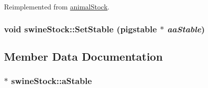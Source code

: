 Reimplemented from \hyperlink{classanimal_stock_a725a20b1ebac99314da9371c17aaad82}{animalStock}.\hypertarget{classswine_stock_a6e44014411d40ef8496be5bc0090c2a4}{
\subsubsection[{SetStable}]{\setlength{\rightskip}{0pt plus 5cm}void swineStock::SetStable ({\bf pigstable} $\ast$ {\em aaStable})}}
\label{classswine_stock_a6e44014411d40ef8496be5bc0090c2a4}


\subsection{Member Data Documentation}
\hypertarget{classswine_stock_a78239ce5b75f52957d37b09e3bb8fbb9}{
\subsubsection[{aStable}]{$\ast$ {\bf swineStock::aStable}}}
\label{classswine_stock_a78239ce5b75f52957d37b09e3bb8fbb9}


